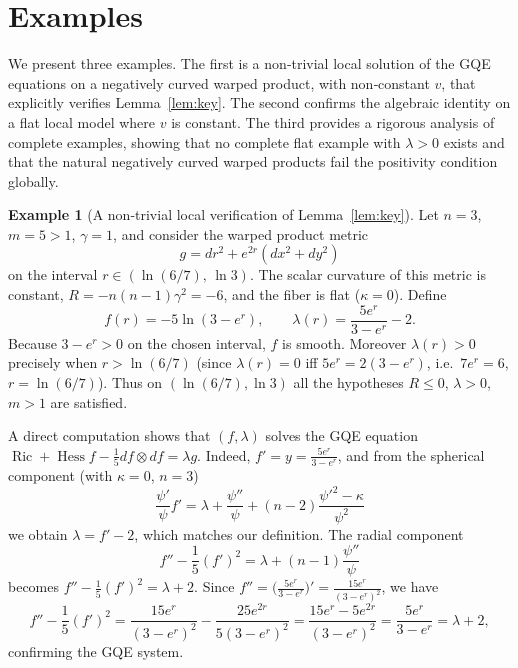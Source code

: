 \documentclass[12pt,a4paper]{article}
\newcommand{\Ric}{\operatorname{Ric}}
\newcommand{\Hess}{\operatorname{Hess}}
\theoremstyle{definition}
\newtheorem{example}[theorem]{Example}
\theoremstyle{definition}
\begin{document}
\section{Examples}
\label{sec:examples}

We present three examples.
The first is a non‑trivial local solution of the GQE equations on a negatively curved warped product, with non‑constant $v$, that explicitly verifies Lemma~\ref{lem:key}.
The second confirms the algebraic identity on a flat local model where $v$ is constant.
The third provides a rigorous analysis of complete examples, showing that no complete flat example with $\lambda>0$ exists and that the natural negatively curved warped products fail the positivity condition globally.

\begin{example}[A non‑trivial local verification of Lemma~\ref{lem:key}]\label{ex:nontrivial}
Let $n=3$, $m=5>1$, $\gamma=1$, and consider the warped product metric
\[
g = dr^{2} + e^{2r}(dx^{2}+dy^{2})
\]
on the interval $r\in(\ln(6/7),\,\ln 3)$.
The scalar curvature of this metric is constant, $R = -n(n-1)\gamma^{2} = -6$, and the fiber is flat ($\kappa=0$).
Define
\[
f(r) = -5\ln(3-e^{r}),\qquad
\lambda(r) = \frac{5e^{r}}{3-e^{r}} - 2.
\]
Because $3-e^{r}>0$ on the chosen interval, $f$ is smooth.
Moreover $\lambda(r)>0$ precisely when $r>\ln(6/7)$ (since $\lambda(r)=0$ iff $5e^{r}=2(3-e^{r})$, i.e.\ $7e^{r}=6$, $r=\ln(6/7)$).
Thus on $(\ln(6/7),\ln 3)$ all the hypotheses $R\le0$, $\lambda>0$, $m>1$ are satisfied.

A direct computation shows that $(f,\lambda)$ solves the GQE equation
$\Ric + \Hess f - \frac{1}{5} df\otimes df = \lambda g$.
Indeed, $f' = y = \frac{5e^{r}}{3-e^{r}}$, and from the spherical component (with $\kappa=0$, $n=3$)
\begin{equation}
\frac{\psi'}{\psi} f' = \lambda + \frac{\psi''}{\psi} + (n-2)\frac{\psi'^{2} - \kappa}{\psi^{2}} \label{eq:spherical}
\end{equation}
we obtain $\lambda = f' - 2$, which matches our definition.
The radial component
\begin{equation}
f'' - \frac{1}{5}(f')^{2} = \lambda + (n-1)\frac{\psi''}{\psi} \label{eq:radial}
\end{equation}
becomes $f'' - \frac{1}{5}(f')^{2} = \lambda + 2$.
Since $f'' = \bigl(\frac{5e^{r}}{3-e^{r}}\bigr)' = \frac{15e^{r}}{(3-e^{r})^{2}}$, we have
\[
f'' - \frac{1}{5}(f')^{2}
= \frac{15e^{r}}{(3-e^{r})^{2}} - \frac{25e^{2r}}{5(3-e^{r})^{2}}
= \frac{15e^{r} - 5e^{2r}}{(3-e^{r})^{2}}
= \frac{5e^{r}}{3-e^{r}} = \lambda+2,
\]
confirming the GQE system.


\end{example}
\end{document}
